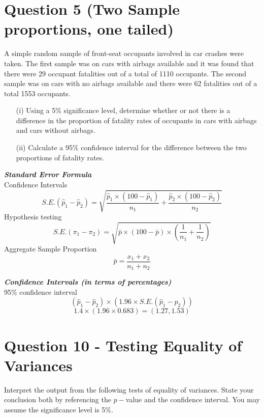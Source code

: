 \documentclass[a4paper,12pt]{article}
\begin{document}
\section*{Question 5 (Two Sample proportions, one tailed)}

A simple random sample of front-seat occupants involved in car crashes were taken. 
The first sample was on cars with airbags available and it was found that there were 29 occupant fatalities out of a total of 1110 occupants. The second sample was on cars with no airbags available and
there were 62 fatalities out of a total 1553 occupants.
\begin{itemize}
\item[(i)] Using a 5\% significance level, determine whether or not there is a difference in the proportion of fatality rates of occupants in cars with airbags and cars without airbags.
\item[(ii)] Calculate a 95\% confidence interval for the difference between the two proportions of fatality rates.
\end{itemize}

\noindent \textbf{\textit{Standard Error Formula }}\\
Confidence Intervals
\[ S.E.(\hat{p}_1 - \hat{p}_2)  = \sqrt{\frac{\hat{p}_1 \times (100 - \hat{p}_1)}{n_1} + \frac{\hat{p}_2 \times (100 - \hat{p}_2)}{n_2}} \]
Hypothesis testing
\[ S.E.(\pi_1 - \pi_2)  = \sqrt{\bar{p} \times (100 - \bar{p}) \times \left( \frac{1}{n_1} + \frac{1}{n_2}\right)} \]
Aggregate Sample Proportion
\[  \bar{p} = \frac{x_1+x_2}{n_1+n_2} \]


\noindent \textbf{\textit{Confidence Intervals (in terms of percentages) }}\\
95\% confidence interval
\[ (\hat{p}_1 - \hat{p}_2 ) \times (1.96 \times S.E.(\hat{p}_1 - \hat{p}_2))\]
\[ 1.4 \times (1.96 \times 0.683) =  (1.27,1.53)\]

\newpage
\section*{Question 10 - Testing Equality of Variances}
Interpret the output from the following tests of equality of variances. State your conclusion both by referencing the $p-$value and the confidence interval. You may assume the significance level is 5\%.
\end{document}
